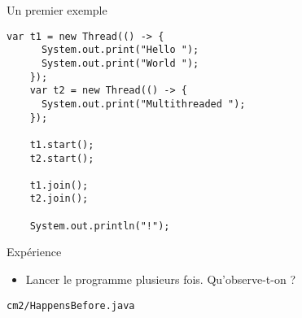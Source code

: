 
\begingroup

\begin{frame}[fragile]{Un premier exemple}

  \begin{lstlisting}[numbers=none]
    var t1 = new Thread(() -> {
      System.out.print("Hello ");
      System.out.print("World ");
    });
    var t2 = new Thread(() -> {
      System.out.print("Multithreaded ");
    });
    
    t1.start();
    t2.start();

    t1.join();
    t2.join();

    System.out.println("!");
  \end{lstlisting}
  \vfill
  \begin{block}{Expérience}
    \begin{itemize}
    \item Lancer le programme plusieurs fois. Qu'observe-t-on ? 
    \end{itemize}
  \end{block}
  \begin{citing}
    \jitem \lstinline{cm2/HappensBefore.java}
  \end{citing}
\end{frame}

\endgroup
\endinput
